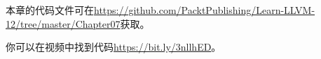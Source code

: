 本章的代码文件可在\url{https://github.com/PacktPublishing/Learn-LLVM-12/tree/master/Chapter07}获取。\par

你可以在视频中找到代码\url{https://bit.ly/3nllhED}。\par
